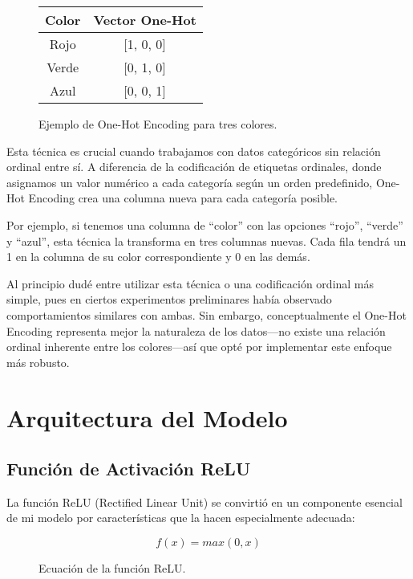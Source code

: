 \begin{figure}[h!]
    \centering
    \begin{tabular}{c|c}
        Color & Vector One-Hot \\
        \hline
        Rojo & [1, 0, 0] \\
        Verde & [0, 1, 0] \\
        Azul & [0, 0, 1]
    \end{tabular}
    \caption{Ejemplo de One-Hot Encoding para tres colores.}
    \label{fig:one_hot_encoding}
\end{figure}

Esta técnica es crucial cuando trabajamos con datos categóricos sin relación ordinal entre sí. A diferencia de la codificación de etiquetas ordinales, donde asignamos un valor numérico a cada categoría según un orden predefinido, One-Hot Encoding crea una columna nueva para cada categoría posible.

Por ejemplo, si tenemos una columna de \textquotedblleft color\textquotedblright{} con las opciones \textquotedblleft rojo\textquotedblright{}, \textquotedblleft verde\textquotedblright{} y \textquotedblleft azul\textquotedblright{}, esta técnica la transforma en tres columnas nuevas. Cada fila tendrá un 1 en la columna de su color correspondiente y 0 en las demás.

Al principio dudé entre utilizar esta técnica o una codificación ordinal más simple, pues en ciertos experimentos preliminares había observado comportamientos similares con ambas. Sin embargo, conceptualmente el One-Hot Encoding representa mejor la naturaleza de los datos—no existe una relación ordinal inherente entre los colores—así que opté por implementar este enfoque más robusto.

\section{Arquitectura del Modelo}

\subsection{Función de Activación ReLU}
La función ReLU (Rectified Linear Unit) se convirtió en un componente esencial de mi modelo por características que la hacen especialmente adecuada:

\begin{figure}[h!]
    \centering
    \begin{equation}
        f(x) = max(0, x)
    \end{equation}
    \caption{Ecuación de la función ReLU.}
    \label{fig:relu_equation}
\end{figure}

